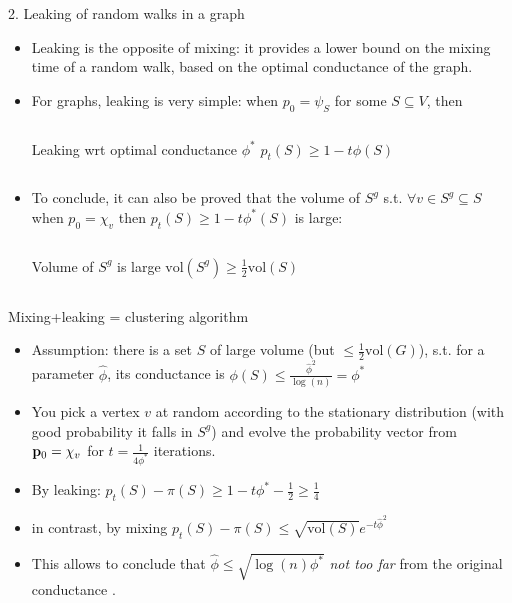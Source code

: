 \documentclass[../main.tex]{subfiles}
\begin{document}
    \begin{frame}{2. Leaking of random walks in a graph}
        \begin{itemize}
            \item Leaking is the opposite of mixing: it provides a lower bound on the mixing time of a random walk, based on the optimal conductance of the graph.
            \item For graphs, leaking is very simple: when $p_0= \psi_S$ for some $S\subseteq V$, then
                \begin{columns}
                    \begin{block}{Leaking wrt optimal conductance $\phi^*$}
                        $p_t(S) \geq 1 - t\phi(S)$
                    \end{block}
                \end{columns}
            \item To conclude, it can also be proved that the volume of $S^g$ s.t. $\forall v\in S^g\subseteq S$ when $p_0 = \chi_v$ then $p_t(S)\geq 1-t\phi^*(S)$ is large:
                \begin{columns}
                    \begin{block}{Volume of $S^g$ is large}
                        $\text{vol}(S^g) \geq \frac{1}{2}\text{vol}(S)$
                    \end{block}
                \end{columns}
        \end{itemize}
    \end{frame}
    
    \begin{frame}{Mixing+leaking = clustering algorithm}
        \begin{itemize}
            \item Assumption: there is a set $S$ of large volume (but $\leq \frac{1}{2}\text{vol}(G)$), s.t. for a parameter $\hat{\phi}$, its conductance is $\phi(S) \leq \frac{\hat{\phi}^2}{\log(n)} = \phi^*$
            \item You pick a vertex $v$ at random according to the stationary distribution (with good probability it falls in $S^g$) and evolve the probability vector from $\bold{p}_0 = \chi_v$ for $t=\frac{1}{4\phi^*}$ iterations.
            \item By leaking: $p_t(S) - \pi(S) \geq 1 - t\phi^* - \frac{1}{2} \geq \frac{1}{4}$
            \item in contrast, by mixing $p_t(S) - \pi(S) \leq \sqrt{\text{vol}(S)}e^{-t\hat{\phi}^2}$
            \item This allows to conclude that $\hat{\phi} \leq \sqrt{\log(n) \phi^*}$ \textit{not too far} from the original conductance \cite{SpielmanClustering}.
        \end{itemize}
    \end{frame}
    
\end{document}
